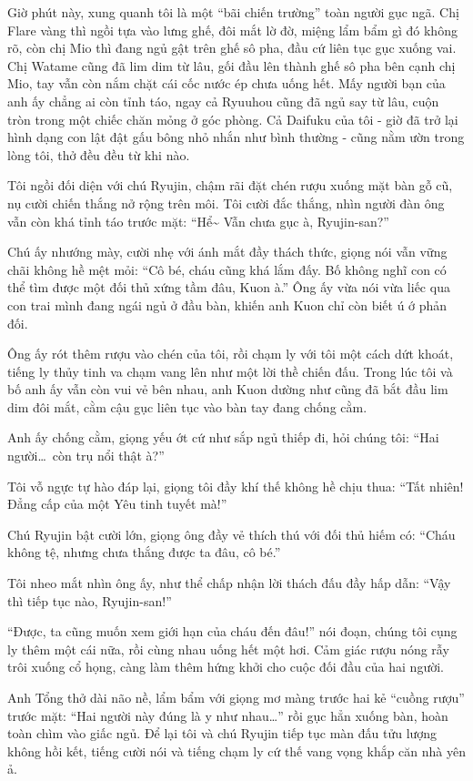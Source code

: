 \documentclass[../main.tex]{subfiles}
\begin{document}
Giờ phút này, xung quanh tôi là một ``bãi chiến trường'' toàn người gục ngã. Chị Flare vàng thì ngồi tựa vào lưng ghế, đôi mắt lờ đờ, miệng lẩm bẩm gì đó không rõ, còn chị Mio thì đang ngủ gật trên ghế sô pha, đầu cứ liên tục gục xuống vai. Chị Watame cũng đã lim dim từ lâu, gối đầu lên thành ghế sô pha bên cạnh chị Mio, tay vẫn còn nắm chặt cái cốc nước ép chưa uống hết. Mấy người bạn của anh ấy chẳng ai còn tỉnh táo, ngay cả Ryuuhou cũng đã ngủ say từ lâu, cuộn tròn trong một chiếc chăn mỏng ở góc phòng. Cả Daifuku của tôi - giờ đã trở lại hình dạng con lật đật gấu bông nhỏ nhắn như bình thường - cũng nằm ườn trong lòng tôi, thở đều đều từ khi nào.

Tôi ngồi đối diện với chú Ryujin, chậm rãi đặt chén rượu xuống mặt bàn gỗ cũ, nụ cười chiến thắng nở rộng trên môi. Tôi cười đắc thắng, nhìn người đàn ông vẫn còn khá tỉnh táo trước mặt: ``Hể\~{} Vẫn chưa gục à, Ryujin-san?''

Chú ấy nhướng mày, cười nhẹ với ánh mắt đầy thách thức, giọng nói vẫn vững chãi không hề mệt mỏi: ``Cô bé, cháu cũng khá lắm đấy. Bố không nghĩ con có thể tìm được một đối thủ xứng tầm đâu, Kuon à.'' Ông ấy vừa nói vừa liếc qua con trai mình đang ngái ngủ ở đầu bàn, khiến anh Kuon chỉ còn biết ú ớ phản đối.

Ông ấy rót thêm rượu vào chén của tôi, rồi chạm ly với tôi một cách dứt khoát, tiếng ly thủy tinh va chạm vang lên như một lời thề chiến đấu. Trong lúc tôi và bố anh ấy vẫn còn vui vẻ bên nhau, anh Kuon dường như cũng đã bắt đầu lim dim đôi mắt, cằm cậu gục liên tục vào bàn tay đang chống cằm.

Anh ấy chống cằm, giọng yếu ớt cứ như sắp ngủ thiếp đi, hỏi chúng tôi: ``Hai người\dots\ còn trụ nổi thật à?''

Tôi vỗ ngực tự hào đáp lại, giọng tôi đầy khí thế không hề chịu thua: ``Tất nhiên! Đẳng cấp của một Yêu tinh tuyết mà!''

Chú Ryujin bật cười lớn, giọng ông đầy vẻ thích thú với đối thủ hiếm có: ``Cháu không tệ, nhưng chưa thắng được ta đâu, cô bé.''

Tôi nheo mắt nhìn ông ấy, như thể chấp nhận lời thách đấu đầy hấp dẫn: ``Vậy thì tiếp tục nào, Ryujin-san!''

``Được, ta cũng muốn xem giới hạn của cháu đến đâu!'' nói đoạn, chúng tôi cụng ly thêm một cái nữa, rồi cùng nhau uống hết một hơi. Cảm giác rượu nóng rẫy trôi xuống cổ họng, càng làm thêm hứng khởi cho cuộc đối đầu của hai người.

Anh Tổng thở dài não nề, lẩm bẩm với giọng mơ màng trước hai kẻ ``cuồng rượu'' trước mặt: ``Hai người này đúng là y như nhau\dots'' rồi gục hẳn xuống bàn, hoàn toàn chìm vào giấc ngủ. Để lại tôi và chú Ryujin tiếp tục màn đấu tửu lượng không hồi kết, tiếng cười nói và tiếng chạm ly cứ thế vang vọng khắp căn nhà yên ả.
\end{document}
